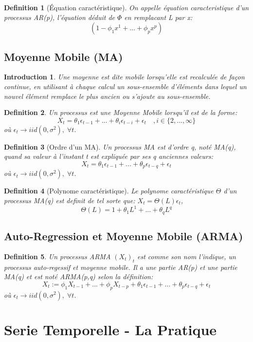 \documentclass{article}
\newtheorem{intro}{Introduction}[section]
\newtheorem{definition}{Definition}[section]
\begin{document}
\begin{definition}[Équation caractéristique]
On appelle équation caracteristique d'un processus AR(p), l'équation déduit de $\Phi$ en remplacant L par x:
$$(1-\phi_1{x^1}+...+\phi_p{x^p})$$
\end{definition}

\newpage

\subsection{Moyenne Mobile (MA)}

\begin{intro}
Une moyenne est dite mobile lorsqu'elle est recalculée de façon continue, en utilisant à chaque calcul un sous-ensemble d'éléments dans lequel un nouvel élément remplace le plus ancien ou s'ajoute au sous-ensemble. 
\end{intro}

\begin{definition}
Un processus est une Moyenne Mobile lorsqu'il est de la forme:
$$X_t=\theta_1{\epsilon_{t-1}}+...+\theta_i{\epsilon_{t-i}}+\epsilon_t \quad ,i\in\{2,...,\infty\}$$
où $\epsilon_t \rightarrow iid(0,\sigma^2), \; \forall t$.
\end{definition}

\begin{definition}[Ordre d'un MA]
Un processus MA est d'ordre q, noté MA(q), quand sa valeur à l'instant t est expliquée par ses q anciennes valeurs: 
$$X_t=\theta_1{\epsilon_{t-1}}+...+\theta_p{\epsilon_{t-q}}+\epsilon_t$$
où $\epsilon_t \rightarrow iid(0,\sigma^2), \; \forall t$.
\end{definition}

\begin{definition}[Polynome caractéristique]
Le polynome caractéristique $\Theta$ d'un processus MA(q) est definit de tel sorte que: $X_t=\Theta(L)\epsilon_t$,
$$\Theta(L)=1+\theta_1{L^1}+...+\theta_q{L^q}$$
\end{definition}

\subsection{Auto-Regression et Moyenne Mobile (ARMA)}

\begin{definition}
Un processus ARMA $(X_t)_t$ est comme son nom l'indique, un processus auto-regessif et moyenne mobile. Il a une partie AR(p) et une partie MA(q) et est noté ARMA(p,q) selon la définition:
$$X_t:=\phi_1{X_{t-1}}+...+\phi_p{X_{t-p}}+\theta_1{\epsilon_{t-1}}+...+\theta_p{\epsilon_{t-q}}+\epsilon_t$$
où $\epsilon_t \rightarrow iid(0,\sigma^2), \; \forall t$.
\end{definition}

\newpage

\section{Serie Temporelle - La Pratique}
\end{document}
